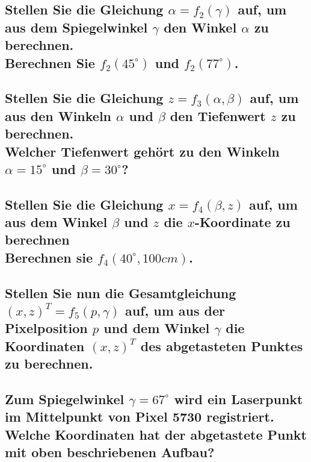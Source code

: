 \documentclass[a4paper,10pt,DIV=14]{scrartcl}
\begin{document}
\subsection{Stellen Sie die Gleichung $\alpha = f_2(\gamma)$ auf, um aus dem Spiegelwinkel $\gamma$ den Winkel $\alpha$ zu berechnen. \\ Berechnen Sie $f_2(45^\circ)$ und $f_2(77^\circ)$.}

\subsection{Stellen Sie die Gleichung $z = f_3(\alpha, \beta)$ auf, um aus den Winkeln $\alpha$ und $\beta$ den Tiefenwert $z$ zu berechnen. \\ Welcher Tiefenwert gehört zu den Winkeln $\alpha = 15^\circ$ und $\beta = 30^\circ$?}

\subsection{Stellen Sie die Gleichung $x = f_4(\beta, z)$ auf, um aus dem Winkel $\beta$ und $z$ die $x$-Koordinate zu berechnen \\ Berechnen sie $f_4(40^\circ, 100cm)$.}

\subsection{Stellen Sie nun die Gesamtgleichung $(x,z)^T = f_5(p, \gamma)$ auf, um aus der Pixelposition $p$ und dem Winkel $\gamma$ die Koordinaten $(x, z)^T$ des abgetasteten Punktes zu berechnen.}

\subsection{Zum Spiegelwinkel $\gamma = 67^\circ$ wird ein Laserpunkt im Mittelpunkt von Pixel 5730 registriert. Welche Koordinaten hat der abgetastete Punkt mit oben beschriebenen Aufbau?}
\end{document}
